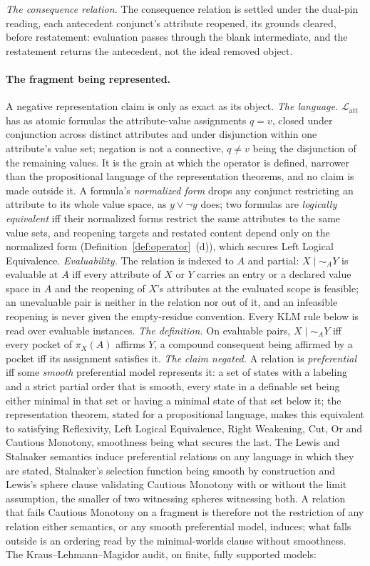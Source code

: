 \textit{The consequence relation.} The consequence relation is settled under the dual-pin reading, each antecedent conjunct's attribute reopened, its grounds cleared, before restatement: evaluation passes through the blank intermediate, and the restatement returns the antecedent, not the ideal removed object. \paragraph{The fragment being represented.} A negative representation claim is only as exact as its object. \emph{The language.} $\mathcal{L}_{\mathrm{att}}$ has as atomic formulas the attribute-value assignments $q{=}v$, closed under conjunction across distinct attributes and under disjunction within one attribute's value set; negation is not a connective, $q \ne v$ being the disjunction of the remaining values. It is the grain at which the operator is defined, narrower than the propositional language of the representation theorems, and no claim is made outside it. A formula's \emph{normalized form} drops any conjunct restricting an attribute to its whole value space, as $y \vee \neg y$ does; two formulas are \emph{logically equivalent} iff their normalized forms restrict the same attributes to the same value sets, and reopening targets and restated content depend only on the normalized form (Definition~\ref{def:operator}~(d)), which secures Left Logical Equivalence. \emph{Evaluability.} The relation is indexed to $A$ and partial: $X \mid\sim_A Y$ is evaluable at $A$ iff every attribute of $X$ or $Y$ carries an entry or a declared value space in $A$ and the reopening of $X$'s attributes at the evaluated scope is feasible; an unevaluable pair is neither in the relation nor out of it, and an infeasible reopening is never given the empty-residue convention. Every KLM rule below is read over evaluable instances. \emph{The definition.} On evaluable pairs, $X \mid\sim_A Y$ iff every pocket of $\pi_X(A)$ affirms $Y$, a compound consequent being affirmed by a pocket iff its assignment satisfies it. \emph{The claim negated.} A relation is \emph{preferential} \parencite{kraus1990} iff some \emph{smooth} preferential model represents it: a set of states with a labeling and a strict partial order that is smooth, every state in a definable set being either minimal in that set or having a minimal state of that set below it; the representation theorem, stated for a propositional language, makes this equivalent to satisfying Reflexivity, Left Logical Equivalence, Right Weakening, Cut, Or and Cautious Monotony, smoothness being what secures the last. The Lewis and Stalnaker semantics induce preferential relations on any language in which they are stated, Stalnaker's selection function being smooth by construction and Lewis's sphere clause validating Cautious Monotony with or without the limit assumption, the smaller of two witnessing spheres witnessing both. A relation that fails Cautious Monotony on a fragment is therefore not the restriction of any relation either semantics, or any smooth preferential model, induces; what falls outside is an ordering read by the minimal-worlds clause without smoothness. The Kraus--Lehmann--Magidor audit, on finite, fully supported models: 